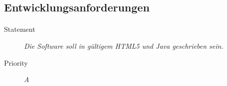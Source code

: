 \subsection{Entwicklungsanforderungen}

\paragraph{}
\begin{description}
\item [Statement] \textit{Die Software soll in gültigem \gls{HTML5} und
    Java geschrieben sein.}
\item [Priority] \textit{A}
\end{description}

